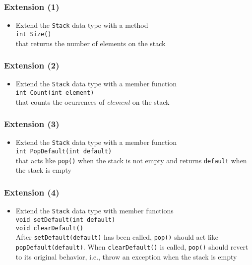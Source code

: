 \documentclass[10pt,aspectratio=169]{beamer}
\begin{document}
\begin{frame}[fragile]
  \frametitle{Extension (1)}  
  \begin{itemize}
  \item Extend the \texttt{Stack} data type with a method\\[1ex]
    \texttt{int Size()}\\[1ex]
    that returns the number of elements on the stack
  \end{itemize}
\end{frame}

\begin{frame}[fragile]
  \frametitle{Extension (2)}  
  \begin{itemize}
  \item Extend the \texttt{Stack} data type with a member function\\[1ex]
    \texttt{int Count(int element)}\\[1ex]
    that counts the ocurrences of \emph{element} on the stack
  \end{itemize}
\end{frame}

\begin{frame}[fragile]
  \frametitle{Extension (3)}  
  \begin{itemize}
  \item Extend the \texttt{Stack} data type with a member function\\[1ex]
    \texttt{int PopDefault(int default)}\\[1ex]
    that acts like \texttt{pop()} when the stack is not empty and
    returns \texttt{default} when the stack is empty
  \end{itemize}
\end{frame}

\begin{frame}[fragile]
  \frametitle{Extension (4)}  
  \begin{itemize}
  \item Extend the \texttt{Stack} data type with member functions\\[1ex]
    \texttt{void setDefault(int default)}\\
    \texttt{void clearDefault()}\\[1ex]
    After \texttt{setDefault(default)} has been called, \texttt{pop()}
    should act like \texttt{popDefault(default)}. When
    \texttt{clearDefault()} is called, \texttt{pop()} should revert to
    its original behavior, i.e., throw an exception when the stack is
    empty
  \end{itemize}
\end{frame}
\end{document}
